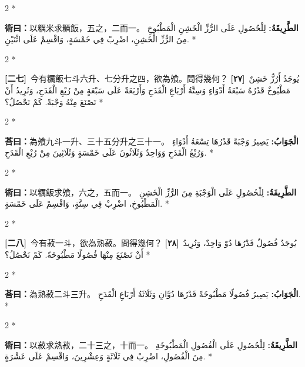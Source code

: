 \documentclass[11pt,a4paper]{article}
\newcommand{\ar}[1]{\arabicfont\beginR #1\endR}
\newcommand{\problemnum}[1]{\textbf{[\ignorespaces#1\unskip]}}
\newenvironment{bilingual}{%
  \begin{paracol}{2}%
  \switchcolumn[0]*%
}{%
  \end{paracol}%
}
\newcommand{\cnline}[1]{\switchcolumn[0]\noindent #1 \switchcolumn[1]}
\newcommand{\arline}[1]{\noindent\ar{#1} \switchcolumn[0]*}
\newenvironment{prob bilingual}{%
  \begin{paracol}{2}%
  \switchcolumn[0]*%
}{%
  \end{paracol}%
  \vspace{0.3em}%
}
\begin{document}
\begin{bilingual}
\cnline{%
\textcolor{methodcolor}{\textbf{術曰：}}以糲米求糲飯，五之，二而一。
}
\arline{%
\textcolor{methodcolor}{\textbf{الطَّرِيقَةُ:}} لِلْحُصُولِ عَلَى الرُّزِّ الْخَشِنِ الْمَطْبُوخِ مِنَ الرُّزِّ الْخَشِنِ، اضْرِبْ فِي خَمْسَةٍ، وَاقْسِمْ عَلَى اثْنَيْنِ.
}
\end{bilingual}

\begin{bilingual}
\cnline{\problemnum{二七}\, 今有糲飯七斗六升、七分升之四，欲為飧。問得幾何？}
\arline{\problemnum{٢٧}\, يُوجَدُ أَرُزٌّ خَشِنٌ مَطْبُوخٌ قَدْرُهُ سَبْعَةُ أَدْوَاءٍ وَسِتَّةُ أَرْبَاعِ الْقَدَحِ وَأَرْبَعَةٌ عَلَى سَبْعَةٍ مِنْ رُبْعِ الْقَدَحِ، وَنُرِيدُ أَنْ نَصْنَعَ مِنْهُ وَجْبَةً. كَمْ نَحْصُلُ؟}
\end{bilingual}

\begin{bilingual}
\cnline{\textcolor{answercolor}{\textbf{荅曰：}}為飧九斗一升、三十五分升之三十一。}
\arline{\textcolor{answercolor}{\textbf{الْجَوَابُ:}} يَصِيرُ وَجْبَةً قَدْرُهَا تِسْعَةُ أَدْوَاءٍ وَرُبْعُ الْقَدَحِ وَوَاحِدٌ وَثَلَاثُونَ عَلَى خَمْسَةٍ وَثَلَاثِينَ مِنْ رُبْعِ الْقَدَحِ.}
\end{bilingual}

\begin{bilingual}
\cnline{%
\textcolor{methodcolor}{\textbf{術曰：}}以糲飯求飧，六之，五而一。
}
\arline{%
\textcolor{methodcolor}{\textbf{الطَّرِيقَةُ:}} لِلْحُصُولِ عَلَى الْوَجْبَةِ مِنَ الرُّزِّ الْخَشِنِ الْمَطْبُوخِ، اضْرِبْ فِي سِتَّةٍ، وَاقْسِمْ عَلَى خَمْسَةٍ.
}
\end{bilingual}

\begin{bilingual}
\cnline{\problemnum{二八}\, 今有菽一斗，欲為熟菽。問得幾何？}
\arline{\problemnum{٢٨}\, يُوجَدُ فُصُولٌ قَدْرُهَا دُوّ وَاحِدٌ، وَنُرِيدُ أَنْ نَصْنَعَ مِنْهَا فُصُولًا مَطْبُوخَةً. كَمْ نَحْصُلُ؟}
\end{bilingual}

\begin{bilingual}
\cnline{\textcolor{answercolor}{\textbf{荅曰：}}為熟菽二斗三升。}
\arline{\textcolor{answercolor}{\textbf{الْجَوَابُ:}} يَصِيرُ فُصُولًا مَطْبُوخَةً قَدْرُهَا دُوَّانِ وَثَلَاثَةُ أَرْبَاعِ الْقَدَحِ.}
\end{bilingual}

\begin{bilingual}
\cnline{%
\textcolor{methodcolor}{\textbf{術曰：}}以菽求熟菽，二十三之，十而一。
}
\arline{%
\textcolor{methodcolor}{\textbf{الطَّرِيقَةُ:}} لِلْحُصُولِ عَلَى الْفُصُولِ الْمَطْبُوخَةِ مِنَ الْفُصُولِ، اضْرِبْ فِي ثَلَاثَةٍ وَعِشْرِينَ، وَاقْسِمْ عَلَى عَشْرَةٍ.
}
\end{bilingual}
\end{document}
